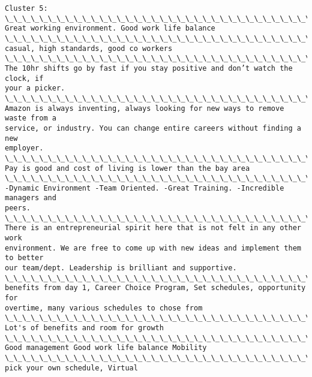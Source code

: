 \documentclass[11pt]{article}
\begin{document}
    \begin{Verbatim}[commandchars=\\\{\}]
Cluster 5:
\_\_\_\_\_\_\_\_\_\_\_\_\_\_\_\_\_\_\_\_\_\_\_\_\_\_\_\_\_\_\_\_\_\_\_\_\_\_\_\_\_\_\_\_\_\_\_\_\_\_\_\_\_\_\_\_\_\_\_\_\_\_\_\_\_\_\_\_\_\_
Great working environment. Good work life balance
\_\_\_\_\_\_\_\_\_\_\_\_\_\_\_\_\_\_\_\_\_\_\_\_\_\_\_\_\_\_\_\_\_\_\_\_\_\_\_\_\_\_\_\_\_\_\_\_\_\_\_\_\_\_\_\_\_\_\_\_\_\_\_\_\_\_\_\_\_\_
casual, high standards, good co workers
\_\_\_\_\_\_\_\_\_\_\_\_\_\_\_\_\_\_\_\_\_\_\_\_\_\_\_\_\_\_\_\_\_\_\_\_\_\_\_\_\_\_\_\_\_\_\_\_\_\_\_\_\_\_\_\_\_\_\_\_\_\_\_\_\_\_\_\_\_\_
The 10hr shifts go by fast if you stay positive and don’t watch the clock, if
your a picker.
\_\_\_\_\_\_\_\_\_\_\_\_\_\_\_\_\_\_\_\_\_\_\_\_\_\_\_\_\_\_\_\_\_\_\_\_\_\_\_\_\_\_\_\_\_\_\_\_\_\_\_\_\_\_\_\_\_\_\_\_\_\_\_\_\_\_\_\_\_\_
Amazon is always inventing, always looking for new ways to remove waste from a
service, or industry. You can change entire careers without finding a new
employer.
\_\_\_\_\_\_\_\_\_\_\_\_\_\_\_\_\_\_\_\_\_\_\_\_\_\_\_\_\_\_\_\_\_\_\_\_\_\_\_\_\_\_\_\_\_\_\_\_\_\_\_\_\_\_\_\_\_\_\_\_\_\_\_\_\_\_\_\_\_\_
Pay is good and cost of living is lower than the bay area
\_\_\_\_\_\_\_\_\_\_\_\_\_\_\_\_\_\_\_\_\_\_\_\_\_\_\_\_\_\_\_\_\_\_\_\_\_\_\_\_\_\_\_\_\_\_\_\_\_\_\_\_\_\_\_\_\_\_\_\_\_\_\_\_\_\_\_\_\_\_
-Dynamic Environment -Team Oriented. -Great Training. -Incredible managers and
peers.
\_\_\_\_\_\_\_\_\_\_\_\_\_\_\_\_\_\_\_\_\_\_\_\_\_\_\_\_\_\_\_\_\_\_\_\_\_\_\_\_\_\_\_\_\_\_\_\_\_\_\_\_\_\_\_\_\_\_\_\_\_\_\_\_\_\_\_\_\_\_
There is an entrepreneurial spirit here that is not felt in any other work
environment. We are free to come up with new ideas and implement them to better
our team/dept. Leadership is brilliant and supportive.
\_\_\_\_\_\_\_\_\_\_\_\_\_\_\_\_\_\_\_\_\_\_\_\_\_\_\_\_\_\_\_\_\_\_\_\_\_\_\_\_\_\_\_\_\_\_\_\_\_\_\_\_\_\_\_\_\_\_\_\_\_\_\_\_\_\_\_\_\_\_
benefits from day 1, Career Choice Program, Set schedules, opportunity for
overtime, many various schedules to chose from
\_\_\_\_\_\_\_\_\_\_\_\_\_\_\_\_\_\_\_\_\_\_\_\_\_\_\_\_\_\_\_\_\_\_\_\_\_\_\_\_\_\_\_\_\_\_\_\_\_\_\_\_\_\_\_\_\_\_\_\_\_\_\_\_\_\_\_\_\_\_
Lot's of benefits and room for growth
\_\_\_\_\_\_\_\_\_\_\_\_\_\_\_\_\_\_\_\_\_\_\_\_\_\_\_\_\_\_\_\_\_\_\_\_\_\_\_\_\_\_\_\_\_\_\_\_\_\_\_\_\_\_\_\_\_\_\_\_\_\_\_\_\_\_\_\_\_\_
Good management Good work life balance Mobility
\_\_\_\_\_\_\_\_\_\_\_\_\_\_\_\_\_\_\_\_\_\_\_\_\_\_\_\_\_\_\_\_\_\_\_\_\_\_\_\_\_\_\_\_\_\_\_\_\_\_\_\_\_\_\_\_\_\_\_\_\_\_\_\_\_\_\_\_\_\_
pick your own schedule, Virtual

\end{Verbatim}
\end{document}
